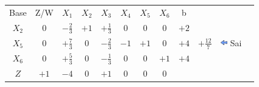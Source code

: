 \documentclass{beamer}
\begin{document}
\begin{frame}
{\begin{table}
\begin{tabular}{c c c c c c c c c c c c}
				\cellcolor{blue!100} \color{white} \scriptsize Base 
				&\cellcolor{blue!100} \color{white} \scriptsize Z/W
				&\cellcolor{blue!100} \color{white} $\scriptstyle X_1$ 
				&\cellcolor{blue!100} \color{red} $\scriptstyle X_2$ 
				&\cellcolor{blue!100} \color{white}   $\scriptstyle X_3$ 
				&\cellcolor{blue!100} \color{white} $\scriptstyle X_4$ 
				&\cellcolor{blue!100} \color{red}   $\scriptstyle X_5$ 
				&\cellcolor{blue!100} \color{red}   $\scriptstyle X_6$ 
				&\cellcolor{blue!100} \color{white} \scriptsize b
				&
				&
				& \\
				\cellcolor{blue!100} \color{red} $\scriptstyle X_2$
				& \cellcolor{yellow!50} $\scriptstyle 0$
				& \cellcolor{gray!50} $\scriptstyle -\frac{2}{3}$
				& \cellcolor{yellow!50} $\scriptstyle +1$
				& \cellcolor{yellow!50} $\scriptstyle +\frac{1}{3}$
				& \cellcolor{yellow!50} $\scriptstyle 0$
				& \cellcolor{yellow!50} $\scriptstyle 0$
				& \cellcolor{yellow!50} $\scriptstyle 0$
				& \cellcolor{gray!50} $\scriptstyle +2$ \\
			    \cellcolor{blue!100} \color{red} $\scriptstyle X_5$
				& \cellcolor{gray!50} $\scriptstyle 0$
				& \cellcolor{red!50} $\scriptstyle +\frac{7}{3}$
				& \cellcolor{gray!50} $\scriptstyle 0$
				& \cellcolor{gray!50} $\scriptstyle -\frac{2}{3}$			
				& \cellcolor{gray!50} $\scriptstyle -1$
				& \cellcolor{gray!50} $\scriptstyle +1$
				& \cellcolor{gray!50} $\scriptstyle 0$ 
				& \cellcolor{gray!50} $\scriptstyle +4$ 
				& $ \scriptstyle +\frac{12}{7} $ 
				& \includegraphics[width=0.3cm,height=0.3cm]{setaesquerda.jpg}  \scriptsize Sai \\
				\cellcolor{blue!100} \color{red} $\scriptstyle X_6$
				& \cellcolor{yellow!50} $\scriptstyle 0$
				& \cellcolor{gray!50} $\scriptstyle +\frac{5}{3}$
				& \cellcolor{yellow!50} $\scriptstyle 0$
				& \cellcolor{yellow!50} $\scriptstyle -\frac{1}{3}$
				& \cellcolor{yellow!50} $\scriptstyle 0$
				& \cellcolor{yellow!50} $\scriptstyle 0$
				& \cellcolor{yellow!50} $\scriptstyle +1$
				& \cellcolor{gray!50} $\scriptstyle +4$ \\
				\cellcolor{blue!100} \color{white} $\scriptstyle Z$
				& \cellcolor{yellow!50} $\scriptstyle +1$
				& \cellcolor{gray!50} $\scriptstyle -4$
				& \cellcolor{yellow!50} $\scriptstyle 0$
				& \cellcolor{yellow!50} $\scriptstyle +1$
				& \cellcolor{yellow!50} $\scriptstyle 0$
				& \cellcolor{yellow!50} $\scriptstyle 0$
				& \cellcolor{yellow!50} $\scriptstyle 0$ 

\end{tabular}
\end{table}}
\end{frame}
\end{document}
